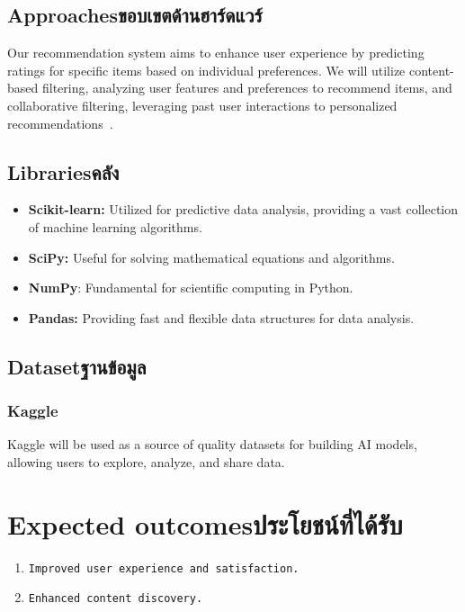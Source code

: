 \subsection{\ifenglish Approaches\else ขอบเขตด้านฮาร์ดแวร์\fi}

Our recommendation system aims to enhance user experience by predicting ratings for specific 
items based on individual preferences. We will utilize content-based filtering, analyzing user 
features and preferences to recommend items, and collaborative filtering, leveraging past user 
interactions to personalized recommendations~\cite{Zhang2021}.

\subsection{\ifenglish Libraries\else คลัง\fi}

\begin{itemize}
    \item \textsf{\textbf{Scikit-learn:} Utilized for predictive data analysis, providing a vast 
    collection of machine learning algorithms.}
    \item \textsf{\textbf{SciPy:} Useful for solving mathematical equations and algorithms.}
    \item \textsf{\textbf{NumPy}: Fundamental for scientific computing in Python.}
    \item \textsf{\textbf{Pandas:} Providing fast and flexible data structures for data analysis.}
\end{itemize}

\subsection{\ifenglish Dataset\else ฐานข้อมูล\fi}

\subsubsection{Kaggle}

Kaggle will be used as a source of quality datasets for building AI models, allowing 
users to explore, analyze, and share data.

\section{\ifenglish Expected outcomes\else ประโยชน์ที่ได้รับ\fi}
\begin{enumerate}
    \item \texttt{Improved user experience and satisfaction.}
    \item \texttt{Enhanced content discovery.}
\end{enumerate}

